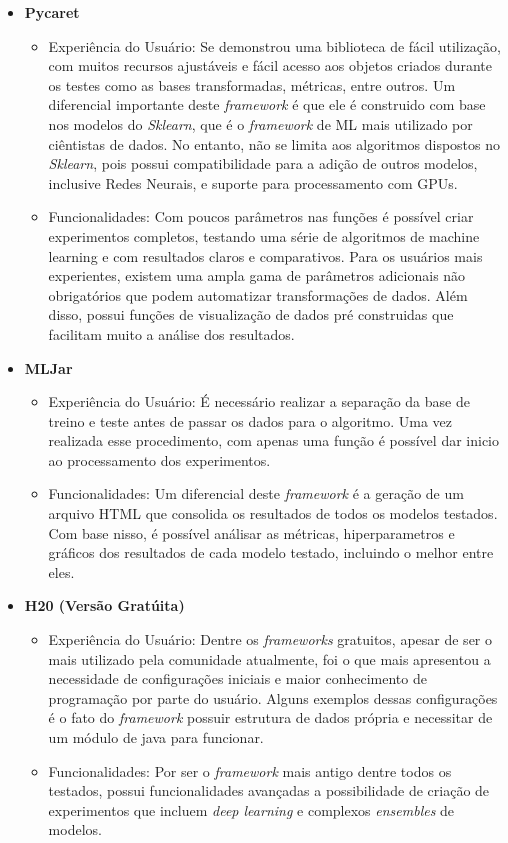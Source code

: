\documentclass[9pt, a4paper, twocolumn]{article}
\begin{document}
\begin{itemize}
\item
  \textbf{Pycaret}

  \begin{itemize}
  \item
    Experiência do Usuário: Se demonstrou uma biblioteca de fácil utilização, com muitos recursos ajustáveis e fácil acesso aos objetos criados durante os testes como as bases transformadas, métricas, entre outros. Um diferencial importante deste \emph{framework} é que ele é construido com base nos modelos do \emph{Sklearn}, que é o \emph{framework} de ML mais utilizado por ciêntistas de dados. No entanto, não se limita aos algoritmos dispostos no \emph{Sklearn}, pois possui compatibilidade para a adição de outros modelos, inclusive Redes Neurais, e suporte para processamento com GPUs.
  \item
    Funcionalidades: Com poucos parâmetros nas funções é possível criar experimentos completos, testando uma série de algoritmos de machine learning e com resultados claros e comparativos. Para os usuários mais experientes, existem uma ampla gama de parâmetros adicionais não obrigatórios que podem automatizar transformações de dados. Além disso, possui funções de visualização de dados pré construidas que facilitam muito a análise dos resultados.
  \end{itemize}
\item
  \textbf{MLJar}

  \begin{itemize}
  \item
    Experiência do Usuário: É necessário realizar a separação da base de treino e teste antes de passar os dados para o algoritmo. Uma vez realizada esse procedimento, com apenas uma função é possível dar inicio ao processamento dos experimentos.
  \item
    Funcionalidades: Um diferencial deste \emph{framework} é a geração de um arquivo HTML que consolida os resultados de todos os modelos testados. Com base nisso, é possível análisar as métricas, hiperparametros e gráficos dos resultados de cada modelo testado, incluindo o melhor entre eles.
  \end{itemize}
\item
  \textbf{H20 (Versão Gratúita)}

  \begin{itemize}
  \item
    Experiência do Usuário: Dentre os \emph{frameworks} gratuitos, apesar de ser o mais utilizado pela comunidade atualmente, foi o que mais apresentou a necessidade de configurações iniciais e maior conhecimento de programação por parte do usuário. Alguns exemplos dessas configurações é o fato do \emph{framework} possuir estrutura de dados própria e necessitar de um módulo de java para funcionar.
  \item
    Funcionalidades: Por ser o \emph{framework} mais antigo dentre todos os testados, possui funcionalidades avançadas a possibilidade de criação de experimentos que incluem \emph{deep learning} e complexos \emph{ensembles} de modelos.
  \end{itemize}
\end{itemize}
\end{document}
